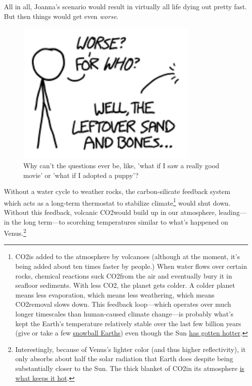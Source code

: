 {{All in all, Joanna's scenario would result in virtually all life dying out pretty fast. But then things would get even \emph{worse}.}

\begin{figure}[!htbp]
\centering
\includegraphics[scale=0.5, max width=0.8\textwidth]{imgs/a/103/how.png}
\caption{Why can't the questions ever be, like, 'what if I saw a really good movie' or 'what if I adopted a puppy'?}
\end{figure}

{Without a water cycle to weather rocks, the carbon-silicate feedback system which acts as a long-term thermostat to stabilize climate{\footnote{CO2is added to the atmosphere by volcanoes (although at the moment, it's being added about ten times faster by people.) When water flows over certain rocks, chemical reactions suck CO2from the air and eventually bury it in seafloor sediments. With less CO2, the planet gets colder. A colder planet means less evaporation, which means less weathering, which means CO2removal slows down. This feedback loop—which operates over much longer timescales than human-caused climate change—is probably what's kept the Earth's temperature relatively stable over the last few billion years (give or take a few \href{http://www.snowballearth.org/overview.html}{snowball Earths}) even though the Sun \href{https://en.wikipedia.org/wiki/Faint\_young\_Sun\_paradox}{has gotten hotter}.} } would shut down. Without this feedback, volcanic CO2would build up in our atmosphere, leading—in the long term—to scorching temperatures similar to what's happened on Venus.{\footnote{Interestingly, because of Venus's lighter color (and thus higher reflectivity), it only absorbs about half the solar radiation that Earth does despite being substantially closer to the Sun. The thick blanket of CO2in its atmosphere \href{http://www.skepticalscience.com/Venus-runaway-greenhouse-effect.htm} {is what keeps it hot}.} } }

}
